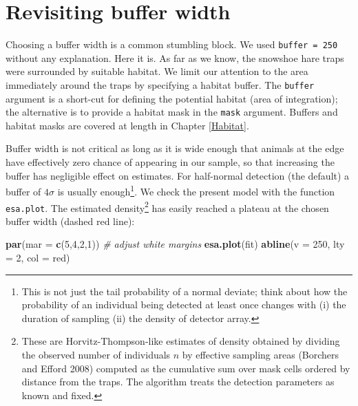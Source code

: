 \documentclass[
]{book}
\newenvironment{Shaded}{\begin{snugshade}}{\end{snugshade}}
\newcommand{\AttributeTok}[1]{\textcolor[rgb]{0.13,0.29,0.53}{#1}}
\newcommand{\CommentTok}[1]{\textcolor[rgb]{0.56,0.35,0.01}{\textit{#1}}}
\newcommand{\DecValTok}[1]{\textcolor[rgb]{0.00,0.00,0.81}{#1}}
\newcommand{\FunctionTok}[1]{\textcolor[rgb]{0.13,0.29,0.53}{\textbf{#1}}}
\newcommand{\NormalTok}[1]{#1}
\newcommand{\StringTok}[1]{\textcolor[rgb]{0.31,0.60,0.02}{#1}}
\begin{document}
\section{Revisiting buffer width}\label{revisiting-buffer-width}

Choosing a buffer width is a common stumbling block. We used \texttt{buffer\ =\ 250} without any explanation. Here it is. As far as we know, the snowshoe hare traps were surrounded by suitable habitat. We limit our attention to the area immediately around the traps by specifying a habitat buffer. The \texttt{buffer} argument is a short-cut for defining the potential habitat (area of integration); the alternative is to provide a habitat mask in the \texttt{mask} argument. Buffers and habitat masks are covered at length in Chapter \ref{Habitat}.

Buffer width is not critical as long as it is wide enough that animals at the edge have effectively zero chance of appearing in our sample, so that increasing the buffer has negligible effect on estimates. For half-normal detection (the default) a buffer of \(4\sigma\) is usually enough\footnote{This is not just the tail probability of a normal deviate; think about how the probability of an individual being detected at least once changes with (i) the duration of sampling (ii) the density of detector array.}. We check the present model with the function \texttt{esa.plot}. The estimated density\footnote{These are Horvitz-Thompson-like estimates of density obtained by dividing the observed number of individuals \(n\) by effective sampling areas (Borchers and Efford 2008) computed as the cumulative sum over mask cells ordered by distance from the traps. The algorithm treats the detection parameters as known and fixed.} has easily reached a plateau at the chosen buffer width (dashed red line):

\begin{Shaded}
\begin{Highlighting}[]
\FunctionTok{par}\NormalTok{(}\AttributeTok{mar =} \FunctionTok{c}\NormalTok{(}\DecValTok{5}\NormalTok{,}\DecValTok{4}\NormalTok{,}\DecValTok{2}\NormalTok{,}\DecValTok{1}\NormalTok{))  }\CommentTok{\# adjust white margins}
\FunctionTok{esa.plot}\NormalTok{(fit)}
\FunctionTok{abline}\NormalTok{(}\AttributeTok{v =} \DecValTok{250}\NormalTok{, }\AttributeTok{lty =} \DecValTok{2}\NormalTok{, }\AttributeTok{col =} \StringTok{\textquotesingle{}red\textquotesingle{}}\NormalTok{)}
\end{Highlighting}
\end{Shaded}
\end{document}
